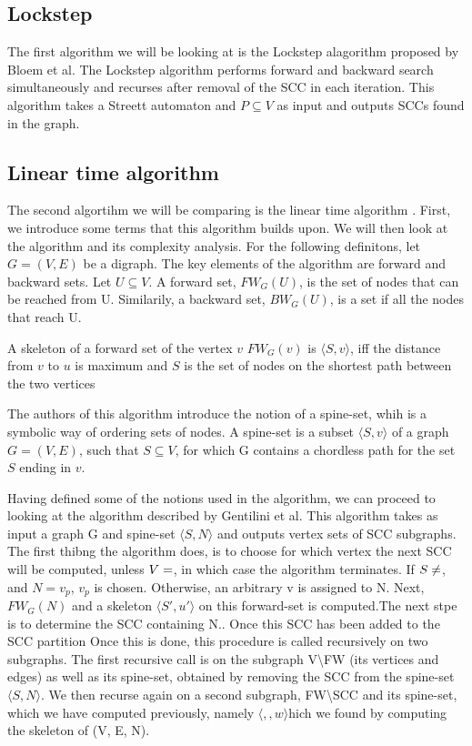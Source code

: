 \documentclass[../master.tex]{subfiles}
\newcommand{\FW}[2][G]{\ensuremath{FW_{#1}(#2)}}
\newcommand{\BW}[2][G]{\ensuremath{BW_{#1}(#2)}}
\newcommand{\pair}[2]{\ensuremath{\langle #1, #2\rangle}}
\begin{document}
\subsection{Lockstep}
The first algorithm we will be looking at is the Lockstep alagorithm proposed by Bloem et al. \cite{lockstep}
The Lockstep algorithm performs forward and backward search simultaneously and recurses after removal of the SCC in each iteration.
This algorithm takes a Streett automaton and $P\subseteq V$ as input and outputs SCCs found in the graph.


\subsection{Linear time algorithm}
The second algortihm we will be comparing is the linear time algorithm \cite{linear}. First, we introduce some terms that this algorithm builds upon. We will then look at the algorithm and its complexity analysis. For the following definitons, let $G=(V,E)$ be a digraph.
The key elements of the algorithm are forward and backward sets. Let $U\subseteq V$. A forward set, \FW{U}, is the set of nodes that can be reached from U. Similarily, a backward set, \BW{U}, is a set if all the nodes that reach U.

A skeleton of a forward set of the vertex $v$ \FW{v} is $\langle S, v \rangle$, iff the distance from $v$ to $u$ is maximum and $S$ is the set of nodes on the shortest path between the two vertices

The authors of this algorithm introduce the notion of a spine-set, whih is a symbolic way of ordering sets of nodes. A spine-set is a subset $\langle S, v\rangle$ of a graph $G=(V,E)$, such that $S\subseteq V$, for which G contains a chordless path for the set $S$ ending in $v$.

Having defined some of the notions used in the algorithm, we can proceed to looking at the algorithm described by Gentilini et al. This algorithm takes as input a graph G and spine-set $\langle S, N\rangle$ and outputs vertex sets of SCC subgraphs.
The first thibng the algorithm does, is to choose for which vertex the next SCC will be computed, unless $V=\empty$, in which case the algorithm terminates. If $S\neq\empty$, and $N={v_p}$, $v_p$ is chosen. Otherwise, an arbitrary v is assigned to N. Next, \FW{N} and a skeleton \pair{S'}{u'} on this forward-set is computed.The next stpe is to determine the SCC containing N.. Once this SCC has been added to the SCC partition 
Once this is done, this procedure is called recursively on two subgraphs. The first recursive call is on the subgraph V\textbackslash FW (its vertices and edges) as well as its spine-set, obtained by removing the SCC from the spine-set $\langle S, N\rangle$. We then recurse again on a second subgraph, FW\textbackslash SCC and its spine-set, which we have computed previously, namely \pair, which we found by computing the skeleton of (V, E, N).
\end{document}
